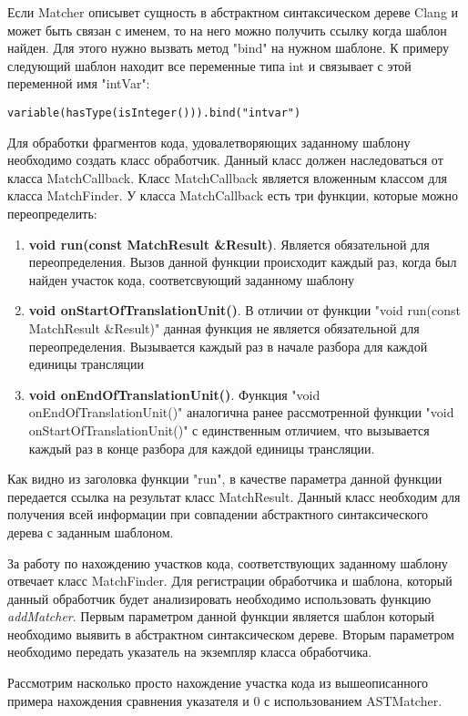 Если Matcher описывет сущность в абстрактном синтаксическом дереве Clang и может быть 
связан с именем, то на него можно получить ссылку когда шаблон найден. Для этого нужно
вызвать метод "bind" на нужном шаблоне. К примеру следующий шаблон находит все переменные типа
int и связывает с этой переменной имя "intVar":
\begin{lstlisting}
variable(hasType(isInteger())).bind("intvar")
\end{lstlisting}

Для обработки фрагментов кода, удовалетворяющих заданному шаблону необходимо создать класс обработчик.
Данный класс должен наследоваться от класса MatchCallback. Класс MatchCallback является вложенным
классом для класса MatchFinder. У класса MatchCallback есть три функции, которые можно переопределить:
\begin{enumerate}
	\item \textbf{void run(const MatchResult \&Result)}. Является обязательной для переопределения.
Вызов данной функции происходит каждый раз, когда был найден участок кода, соответсвующий
заданному шаблону
	\item \textbf{void onStartOfTranslationUnit()}. В отличии от функции "void run(const MatchResult \&Result)"
данная функция не является обязательной для переопределения. Вызывается каждый раз в начале
разбора для каждой единицы трансляции
	\item \textbf{void onEndOfTranslationUnit()}. Функция "void onEndOfTranslationUnit()"
аналогична ранее рассмотренной функции "void onStartOfTranslationUnit()" с единственным отличием,
что вызывается каждый раз в конце разбора для каждой единицы трансляции.
\end{enumerate}

Как видно из заголовка функции "run", в качестве параметра данной функции передается ссылка
на результат класс MatchResult. Данный класс необходим для получения всей информации при
совпадении абстрактного синтаксического дерева с заданным шаблоном. 

За работу по нахождению участков кода, соответствующих заданному шаблону отвечает класс
MatchFinder. Для регистрации обработчика и шаблона, который данный обработчик будет анализировать
необходимо использовать функцию \textit{addMatcher}. Первым параметром данной функции является 
шаблон который необходимо выявить в абстрактном синтаксическом дереве. Вторым параметром необходимо
передать указатель на экземпляр класса обработчика. 

Рассмотрим насколько просто нахождение участка кода из вышеописанного примера нахождения сравнения указателя
и 0 с использованием ASTMatcher.

